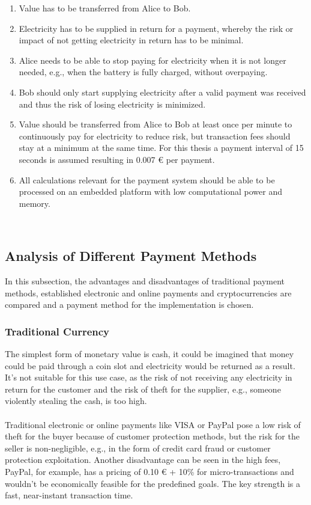\begin{enumerate}
    \item Value has to be transferred from Alice to Bob.
    \item Electricity has to be supplied in return for a payment, whereby the risk or impact of not getting electricity in return has to be minimal.
    \item Alice needs to be able to stop paying for electricity when it is not longer needed, e.g., when the battery is fully charged, without overpaying.
    \item Bob should only start supplying electricity after a valid payment was received and thus the risk of losing electricity is minimized.
    \item Value should be transferred from Alice to Bob at least once per minute to continuously pay for electricity to reduce risk, but transaction fees should stay at a minimum at the same time.
    For this thesis a payment interval of 15 seconds is assumed resulting in 0.007 \euro{} per payment.
    \item All calculations relevant for the payment system should be able to be processed on an embedded platform with low computational power and memory.
\end{enumerate}
\leavevmode
\\
\subsection{Analysis of Different Payment Methods}
In this subsection, the advantages and disadvantages of traditional payment methods, established electronic and online payments and cryptocurrencies are compared and a payment method for the implementation is chosen.
\\
\subsubsection{Traditional Currency}
The simplest form of monetary value is cash, it could be imagined that money could be paid through a coin slot and electricity would be returned as a result.
It's not suitable for this use case, as the risk of not receiving any electricity in return for the customer and the risk of theft for the supplier, e.g., someone violently stealing the cash, is too high.
\\\\
Traditional electronic or online payments like VISA or PayPal pose a low risk of theft for the buyer because of customer protection methods, but the risk for the seller is non-negligible, e.g., in the form of credit card fraud or customer protection exploitation.
Another disadvantage can be seen in the high fees, PayPal, for example, has a pricing of 0.10 \euro{} + 10\% for micro-transactions\cite{paypal-fees} and wouldn't be economically feasible for the predefined goals.
The key strength is a fast, near-instant transaction time.
\\
